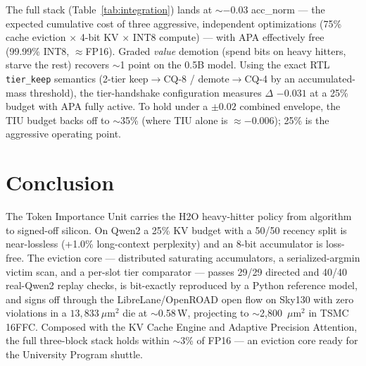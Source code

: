 \documentclass[10pt,twocolumn]{article}
\begin{document}
The full stack (Table~\ref{tab:integration}) lands at $\sim$$-0.03$ acc\_norm ---
the expected cumulative cost of three aggressive, independent optimizations (75\%
cache eviction $\times$ 4-bit KV $\times$ INT8 compute) --- with APA effectively
free (99.99\% INT8, $\approx$FP16). Graded \emph{value} demotion (spend bits on
heavy hitters, starve the rest) recovers $\sim$1 point on the 0.5B model. Using the
exact RTL \texttt{tier\_keep} semantics (2-tier keep$\to$CQ-8 / demote$\to$CQ-4 by
an accumulated-mass threshold), the tier-handshake configuration measures
$\Delta$ $-0.031$ at a 25\% budget with APA fully active. To hold under a
$\pm0.02$ combined envelope, the TIU budget backs off to $\sim$35\% (where TIU
alone is $\approx-0.006$); 25\% is the aggressive operating point.

\section{Conclusion}

The Token Importance Unit carries the H2O heavy-hitter policy from algorithm to
signed-off silicon. On Qwen2 a 25\% KV budget with a 50/50 recency split is
near-lossless (+1.0\% long-context perplexity) and an 8-bit accumulator is
loss-free. The eviction core --- distributed saturating accumulators, a
serialized-argmin victim scan, and a per-slot tier comparator --- passes 29/29
directed and 40/40 real-Qwen2 replay checks, is bit-exactly reproduced by a Python
reference model, and signs off through the LibreLane/OpenROAD open flow on Sky130
with zero violations in a $13{,}833~\mu$m$^2$ die at $\sim$0.58\,\textmu W,
projecting to $\sim$2{,}800~$\mu$m$^2$ in TSMC 16FFC. Composed with the KV Cache
Engine and Adaptive Precision Attention, the full three-block stack holds within
$\sim$3\% of FP16 --- an eviction core ready for the University Program shuttle.



\end{document}
